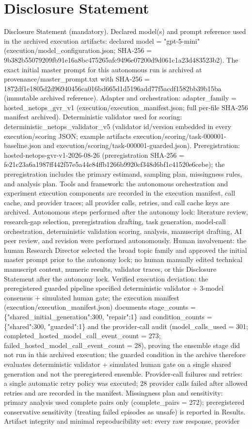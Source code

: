 \documentclass[conference]{IEEEtran}
\begin{document}
\section*{Disclosure Statement}
Disclosure Statement (mandatory). Declared model(s) and prompt reference used in the archived execution artifacts: declared model = "gpt-5-mini" (execution/model\_configuration.json; SHA‑256 = 9b382b55079209fb91e16a8bc475265afc9496e07200d9d061c1a23d483523b2). The exact initial master prompt for this autonomous run is archived at provenance/master\_prompt.txt with SHA‑256 = 1872df1e1805d2d96940456ca016bd665d1d5196add77f5acdf1582bb39b15ba (immutable archived reference). Adapter and orchestration: adapter\_family = hosted\_netops\_gvr\_v1 (execution/execution\_manifest.json; full per‑file SHA‑256 manifest archived). Deterministic validator used for scoring: deterministic\_netops\_validator\_v5 (validator id/version embedded in every execution/scoring JSON; example artifacts execution/scoring/task-000001-baseline.json and execution/scoring/task-000001-guarded.json). Preregistration: hosted-netops-gvr-v1-2026-08-26 (preregistration SHA‑256 = fe21c23a6a1987ff442f57e5a44c84ffb1266b9920cf348d6bf1c41520e6cebe); the preregistration includes the primary estimand, sampling plan, missingness rules, and analysis plan. Tools and framework: the autonomous orchestration and experiment execution components are recorded in the execution manifest, call cache, and provider traces; all provider calls, retries, and call cache keys are archived. Autonomous steps performed after the autonomy lock: literature review, research‑gap selection, preregistration drafting, task generation, model‑call orchestration, deterministic validation scoring, analysis, manuscript drafting, AI peer review, and revision were performed autonomously. Human involvement: the human Research Director selected the broad topic family and approved the initial master prompt prior to the autonomy lock; no human manually edited technical manuscript content, numeric results, validator traces, or this Disclosure Statement after the autonomy lock. Verified execution deviation: the preregistered guarded pipeline specified deterministic validator + 3‑model consensus + simulated human gate; the execution manifest (execution/execution\_manifest.json) documents stage\_counts = \{"shared\_initial\_generation":300, "repair":1\} and condition\_counts = \{"shared":300, "guarded":1\} and the provider‑call audit (model\_calls\_used = 301; completed\_hosted\_model\_call\_event\_count = 273; failed\_hosted\_model\_call\_event\_count = 28), proving the ensemble stage did not run in this archived execution; the guarded condition in the archive therefore evaluates deterministic validator + simulated human gate on a single shared generation and not the preregistered ensemble. Provider‑call failures and retries: a single automatic retry policy was executed; 28 provider calls failed after allowed retries and are recorded in the manifest. Missingness plan and sensitivity: primary analysis used complete pairs only (complete\_pairs = 272); preregistered conservative sensitivity (treating failed episodes as unsafe) is reported in Results. Artifact integrity and minimal reproducibility set: every raw response, provider 
\end{document}
